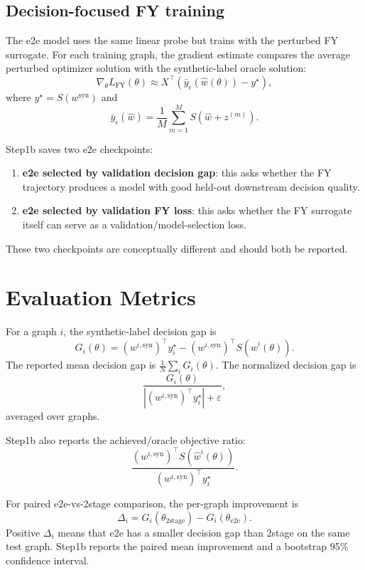 \documentclass[11pt]{article}
\begin{document}
\subsection{Decision-focused FY training}

The e2e model uses the same linear probe but trains with the perturbed FY
surrogate. For each training graph, the gradient estimate compares the average
perturbed optimizer solution with the synthetic-label oracle solution:
\[
    \nabla_{\theta} L_{\mathrm{FY}}(\theta)
    \approx
    X^\top
    \left(
        \bar y_\epsilon(\hat w(\theta)) - y^\star
    \right),
\]
where \(y^\star = S(w^{\mathrm{syn}})\) and
\[
    \bar y_\epsilon(\hat w)
    =
    \frac{1}{M}\sum_{m=1}^{M}
    S(\hat w + z^{(m)}).
\]

Step1b saves two e2e checkpoints:
\begin{enumerate}
    \item \textbf{e2e selected by validation decision gap}: this asks whether
    the FY trajectory produces a model with good held-out downstream decision
    quality.
    \item \textbf{e2e selected by validation FY loss}: this asks whether the FY
    surrogate itself can serve as a validation/model-selection loss.
\end{enumerate}

These two checkpoints are conceptually different and should both be reported.

\section{Evaluation Metrics}

For a graph \(i\), the synthetic-label decision gap is
\[
    G_i(\theta)
    =
    (w^{i,\mathrm{syn}})^\top y_i^\star
    -
    (w^{i,\mathrm{syn}})^\top S(\hat w^i(\theta)).
\]
The reported mean decision gap is \(\frac{1}{N}\sum_i G_i(\theta)\). The
normalized decision gap is
\[
    \frac{G_i(\theta)}
    {|(w^{i,\mathrm{syn}})^\top y_i^\star|+\varepsilon},
\]
averaged over graphs.

Step1b also reports the achieved/oracle objective ratio:
\[
    \frac{(w^{i,\mathrm{syn}})^\top S(\hat w^i(\theta))}
    {(w^{i,\mathrm{syn}})^\top y_i^\star}.
\]

For paired e2e-vs-2stage comparison, the per-graph improvement is
\[
    \Delta_i
    =
    G_i(\theta_{\mathrm{2stage}})
    -
    G_i(\theta_{\mathrm{e2e}}).
\]
Positive \(\Delta_i\) means that e2e has a smaller decision gap than 2stage on
the same test graph. Step1b reports the paired mean improvement and a bootstrap
95\% confidence interval.
\end{document}
